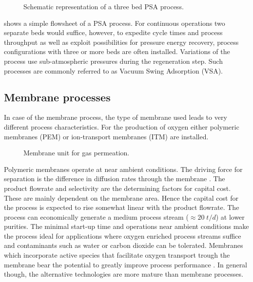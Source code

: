         \begin{figure}
        	\center
        	
        	\caption{Schematic representation of a three bed PSA process.}
        	\label{fig:PSA}
        \end{figure}

         shows a simple flowsheet of a PSA process. For continuous operations two separate beds would
        suffice, however, to expedite cycle times and process throughput as well as exploit possibilities for pressure
        energy recovery, process configurations with three or more beds are often installed. Variations of the process
        use sub-atmospheric pressures during the regeneration step. Such processes are commonly referred to as Vacuum Swing
        Adsorption (VSA).

        \subsection{Membrane processes}
        \label{sec:membrane}
        In case of the membrane process, the type of membrane used leads to very different process characteristics. For the
        production of oxygen either polymeric membranes (PEM) or ion-transport membranes (ITM) are installed.

         \begin{figure}
        	\center
        	
    	    \caption{Membrane unit for gas permeation.}
        	\label{fig:gas_permeation}
        \end{figure}

        Polymeric membranes operate at near ambient conditions. The driving force for separation is the difference
        in diffusion rates through the membrane \cite{Melin.2007}. The product flowrate and selectivity are the
        determining factors for capital cost. These are mainly dependent on the membrane area. Hence
        the capital cost for the process is expected to rise somewhat linear with the product flowrate.
        The process can economically generate a medium process stream ($\approx 20 \; t/d$) at lower purities.
        The minimal start-up time and operations near ambient conditions make the process ideal for
        applications where oxygen enriched process streams suffice and contaminants such as water or carbon
        dioxide can be tolerated. Membranes which incorporate active species that facilitate oxygen transport
        trough the membrane bear the potential to greatly improve process performance \cite{Kammermeyer.1976}.
        In general though, the alternative technologies are more mature than membrane processes.

